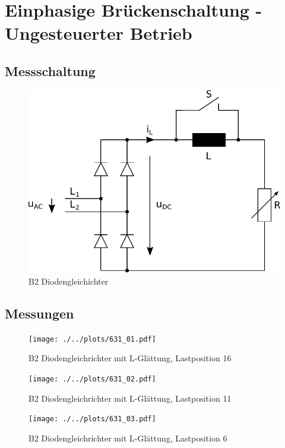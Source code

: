 \section{Einphasige Brückenschaltung - Ungesteuerter Betrieb}

\subsection{Messschaltung}

\begin{figure}[h!]
    \centering
    \includegraphics[scale=\sscale]{./../fig/b2_diode.pdf}
    \caption{B2 Diodengleichichter}
\end{figure}

\subsection{Messungen}

\begin{figure}[h!]
    \centering
    \texttt{[image: ./../plots/631\_01.pdf]}
    \caption{B2 Diodengleichrichter mit L-Glättung, Lastposition 16}
\end{figure}

\begin{figure}[h!]
    \centering
    \texttt{[image: ./../plots/631\_02.pdf]}
    \caption{B2 Diodengleichrichter mit L-Glättung, Lastposition 11}
\end{figure}

\begin{figure}[h!]
    \centering
    \texttt{[image: ./../plots/631\_03.pdf]}
    \caption{B2 Diodengleichrichter mit L-Glättung, Lastposition 6}
\end{figure}

